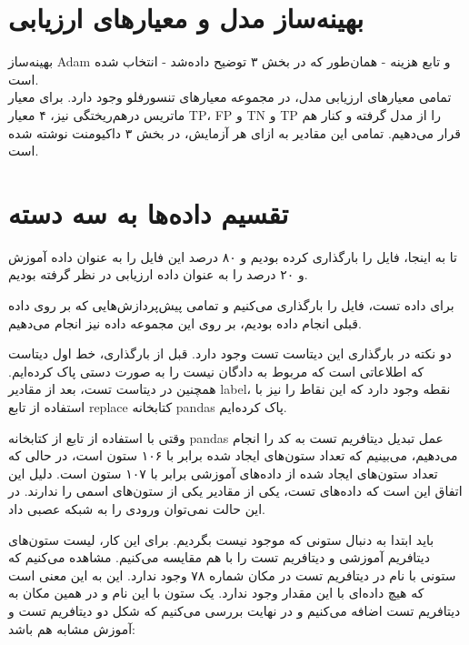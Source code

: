 \documentclass{article}
\begin{document}
\section{
بهینه‌ساز مدل و معیارهای ارزیابی
}

بهینه‌ساز Adam و تابع هزینه  - همان‌طور که در بخش ۳ توضیح داده‌شد - انتخاب شده است. \\

تمامی معیارهای ارزیابی مدل، در مجموعه معیارهای تنسورفلو وجود دارد. برای معیار ماتریس درهم‌ریختگی نیز، ۴ معیار TP، FP و TN و TP را از مدل گرفته و کنار هم قرار می‌دهیم. تمامی این مقادیر به ازای هر آزمایش، در بخش ۳ داکیومنت نوشته شده است.


\section{
تقسیم داده‌ها به سه دسته
}

تا به اینجا، فایل  را بارگذاری کرده بودیم و ۸۰ درصد این فایل را به عنوان داده آموزش و ۲۰ درصد را به عنوان داده ارزیابی در نظر گرفته بودیم.

برای داده‌ تست، فایل  را بارگذاری می‌کنیم و تمامی پیش‌‌پردازش‌هایی که بر روی داده قبلی انجام داده بودیم، بر روی این مجموعه داده نیز انجام می‌دهیم.


دو نکته در بارگذاری این دیتاست تست وجود دارد. قبل از بارگذاری، خط اول دیتاست که اطلاعاتی است که مربوط به دادگان نیست را به صورت دستی پاک کرده‌ایم. همچنین در دیتاست تست، بعد از مقادیر label، نقطه وجود دارد که این نقاط را نیز با استفاده از تابع replace کتابخانه pandas پاک کرده‌ایم.


وقتی با استفاده از تابع  از کتابخانه pandas عمل تبدیل دیتافریم تست به کد  را انجام می‌دهیم، می‌بینیم که تعداد ستون‌های ایجاد شده برابر با ۱۰۶ ستون است، در حالی که تعداد ستون‌های ایجاد شده از داده‌های آموزشی برابر با ۱۰۷ ستون است. دلیل این اتفاق این است که داده‌های تست، یکی از مقادیر یکی از ستون‌های اسمی را ندارند. در این حالت نمی‌توان ورودی را به شبکه عصبی داد. 

باید ابتدا به دنبال ستونی که موجود نیست بگردیم. برای این کار، لیست ستون‌های دیتافریم آموزشی و دیتافریم تست را با هم مقایسه می‌کنیم. مشاهده می‌کنیم که ستونی با نام  در دیتافریم تست در مکان شماره ۷۸ وجود ندارد. این به این معنی است که هیچ‌ داده‌ای با این مقدار وجود ندارد. یک ستون با این نام و در همین مکان به دیتافریم تست اضافه می‌کنیم و در نهایت بررسی می‌کنیم که شکل دو دیتافریم تست و آموزش مشابه هم باشد:
\end{document}
